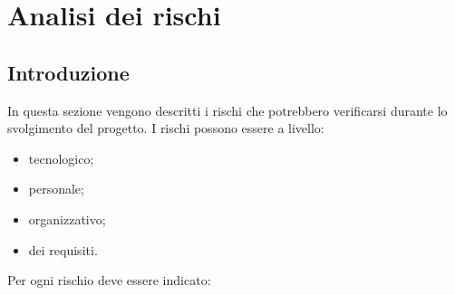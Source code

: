 \section {Analisi dei rischi}
\label{sec:analisirischi}
	\subsection {Introduzione}
	In questa sezione vengono descritti i rischi che potrebbero verificarsi durante lo svolgimento del progetto.
	I rischi possono essere a livello:
	\begin{itemize}
	 \item {tecnologico};
	 \item {personale};
	 \item {organizzativo};
	 \item {dei requisiti}.
	\end{itemize}
	Per ogni rischio deve essere indicato:
